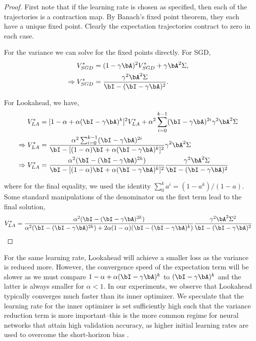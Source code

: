 \begin{proof}
First note that if the learning rate is chosen as specified, then each of the trajectories is a contraction map. By Banach's fixed point theorem, they each have a unique fixed point. Clearly the expectation trajectories contract to zero in each case.

For the variance we can solve for the fixed points directly. For SGD,
\begin{align*}
    V^*_{SGD} &= (1-\gamma \bA)^2 V^*_{SGD} + \gamma \bA^2 \Sigma, \\
    \Rightarrow V^*_{SGD} &= \frac{\gamma^2 \bA^2 \Sigma}{\bI - (\bI - \gamma \bA)^2}.
\end{align*}

For Lookahead, we have,
\begin{align*}
    V^*_{LA} &= [1-\alpha + \alpha (\bI - \gamma \bA)^k]^2 V^*_{LA} +\alpha^2 \sum_{i=0}^{k-1} (\bI - \gamma \bA)^{2i}\gamma^2\bA^2\Sigma \\
    \Rightarrow V^*_{LA} &= \frac{\alpha^2\sum_{i=0}^{k-1} (\bI - \gamma \bA)^{2i}}{\bI - [(1-\alpha)\bI + \alpha (\bI - \gamma \bA)^k]^2} \gamma^2 \bA^2\Sigma \\
\Rightarrow V^*_{LA} &= \frac{\alpha^2 (\bI - (\bI - \gamma\bA)^{2k})}{\bI - [(1 - \alpha) \bI + \alpha(\bI - \gamma\bA)^k]^2} \frac{\gamma^2 \bA^2 \Sigma}{\bI - (\bI - \gamma \bA)^2}
\end{align*}

where for the final equality, we used the identity $\sum_0^k a^i = (1-a^k)/(1-a)$. Some standard manipulations of the denominator on the first term lead to the final solution,
\begin{align*}
    V_{LA}^* = \frac{\alpha^2 (\bI - (\bI - \gamma\bA)^{2k})}{\alpha^2 (\bI - (\bI - \gamma\bA)^{2k}) + 2\alpha(1 - \alpha)(\bI - (\bI - \gamma\bA)^k)} \frac{\gamma^2 \bA^2 \Sigma^2}{\bI - (\bI - \gamma \bA)^2}
\end{align*}
\end{proof}

For the same learning rate, Lookahead will achieve a smaller loss as the variance is reduced more. However, the convergence speed of the expectation term will be slower as we must compare $1-\alpha + \alpha(\bI-\gamma\bA)^k$ to $(\bI-\gamma\bA)^k$ and the latter is always smaller for $\alpha < 1$. In our experiments, we observe that Lookahead typically converges much faster than its inner optimizer. We speculate that the learning rate for the inner optimizer is set sufficiently high such that the variance reduction term is more important--this is the more common regime for neural networks that attain high validation accuracy, as higher initial learning rates are used to overcome the short-horizon bias \citep{wu2018understanding}.

